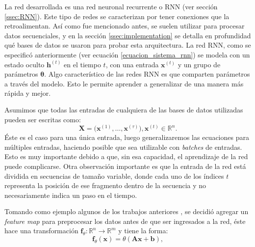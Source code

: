 \documentclass[spanish]{article}
\theoremstyle{definition}
\theoremstyle{remark}
\numberwithin{equation}{section}
\numberwithin{equation}{section} %
\begin{document}
La red desarrollada es una red neuronal recurrente o RNN (ver sección \ref{ssec:RNN}). Este tipo de redes se caracterizan por tener conexiones que la retroalimentan. Así como fue mencionado antes, se suelen utilizar para procesar datos secuenciales, y en la sección \ref{ssec:implementation} se detalla en profundidad qué bases de datos se usaron para probar esta arquitectura. La red RNN, como se especificó anteriormente (ver ecuación \eqref{ecuacion_sistema_rnn}) se modela con un estado oculto $\boldsymbol{h}^{(t)}$ en el tiempo $t$, con una entrada $\boldsymbol{x}^{(t)}$ y un grupo de parámetros $\boldsymbol{\theta}$. Algo característico de las redes RNN es que comparten parámetros a través del modelo. Esto le permite aprender a generalizar de una manera más rápida y mejor.\par
Asumimos que todas las entradas de cualquiera de las bases de datos utilizadas pueden ser escritas como:  
\begin{equation}
\label{eq_dataset_input}
\boldsymbol{X} = \Big( \boldsymbol{x}^{(1)}, \ldots ,\boldsymbol{x}^{(\tau)}\Big), \boldsymbol{x}^{(t)}  \in \mathbb{R} ^{n}.
\end{equation}
Éste es el caso para una única entrada, luego generalizaremos las ecuaciones para múltiples entradas, haciendo posible que sea utilizable con \textit{batches} de entradas. Esto es muy importante debido a que, sin esa capacidad, el aprendizaje de la red puede complicarse. Otra observación importante es que la entrada de la red está dividida en secuencias de tamaño variable, donde cada uno de los índices $t$ representa la posición de ese fragmento dentro de la secuencia y no necesariamente indica un paso en el tiempo. \par
Tomando como ejemplo algunos de los trabajos anteriores \cite{khrulkov2017expressive,khrulkov2019generalized}, se decidió agregar un \textit{feature map} para preprocesar los datos antes de que ser ingresados a la red, éste hace una transformación $\boldsymbol{f}_\theta: \mathbb{R}^{n}\rightarrow\mathbb{R}^{m}$ y tiene la forma:
\begin{equation}
\label{eq_feature_map}
\boldsymbol{f}_\theta(\boldsymbol{x})=\theta(\boldsymbol{A}\boldsymbol{x} +\boldsymbol{b}),
\end{equation}
\end{document}
